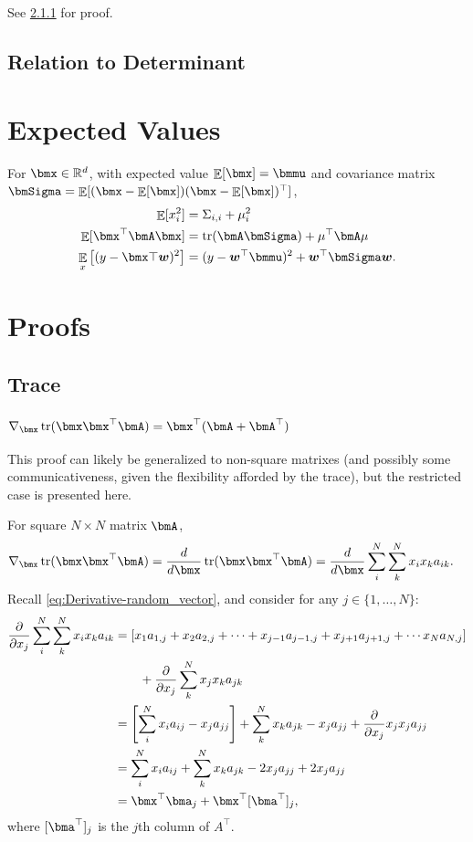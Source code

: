 \documentclass[11pt]{article}
\def\R{{\mathbb{R}}}
\DeclareMathOperator{\E}{\mathbb{E}}
\DeclareMathOperator{\Trace}{tr}
\begin{document}
See \cref{proof:Trace-Derivative-tr(xx'A)} for proof.

\subsection{Relation to Determinant}


\section{Expected Values}
For $\bmx \in \R^d$, with expected value $\E[\bmx] = \bmmu$ and covariance matrix $ \bmSigma = \E[(\bmx - \E[\bmx]) (\bmx - \E[\bmx])^\top]$,
\begin{align}
\E[x_i^2] &= \Sigma_{i,i} + \mu_i^2
\\
\E[\bmx^\top \bmA \bmx] &= \Trace(\bmA \bmSigma) + \mu^\top \bmA \mu
\\
\E_{x} \left[ (y - \bmx\top \bm{w})^2 \right]
&= (y - \bm{w}^\top \bmmu)^2 + \bm{w}^\top \bmSigma \bm{w}.
\end{align}

\appendix
\section{Proofs}
\subsection{Trace}
\subsubsection{\hyperref[sec:Trace-Derivative-tr(xx'A)]{$\nabla_{\bmx}\Trace(\bmx \bmx^\top \bmA) = \bmx^\top (\bmA + \bmA^\top)$}}
\label{proof:Trace-Derivative-tr(xx'A)}
This proof can likely be generalized to non-square matrixes (and possibly some communicativeness, given the flexibility afforded by the trace), but the restricted case is presented here.

For square $N\times N$ matrix $\bmA$,
\begin{align*}
\nabla_{\bmx}\Trace(\bmx \bmx^\top \bmA) =
\frac{d}{d \bmx}\Trace(\bmx \bmx^\top \bmA) &=
\frac{d}{d \bmx} \sum_{i}^{N} \sum_{k}^{N} x_i x_k a_{ik}.
\end{align*}
Recall \cref{eq:Derivative-random_vector}, and consider for any $j \in \{1,\ldots, N\}$:
\begin{align*}
\frac{\partial}{\partial x_j} \sum_{i}^{N} \sum_{k}^{N} x_i x_k a_{ik} &=
[x_1a_{1,j} + x_2a_{2,j} + \cdots + x_{j-1}a_{j-1,j} + x_{j+1}a_{j+1,j} + \cdots x_N a_{N,j}] \\ &\qquad + \frac{\partial}{\partial x_j} \sum_{k}^{N} x_j x_k a_{jk} \\
&= \left[\sum_i^N x_ia_{ij} - x_ja_{jj}\right] + \sum_{k}^{N} x_k a_{jk} - x_ja_{jj} + \frac{\partial}{\partial x_j} x_j x_j a_{jj} \\
&= \sum_i^N x_ia_{ij} + \sum_{k}^{N} x_k a_{jk} - 2 x_ja_{jj} + 2 x_ja_{jj} \\
&= \bmx^\top \bma_j + \bmx^\top [\bma^\top]_j,
\end{align*}
where $[\bma^\top]_j$ is the $j$th column of $A^\top$.
\end{document}
